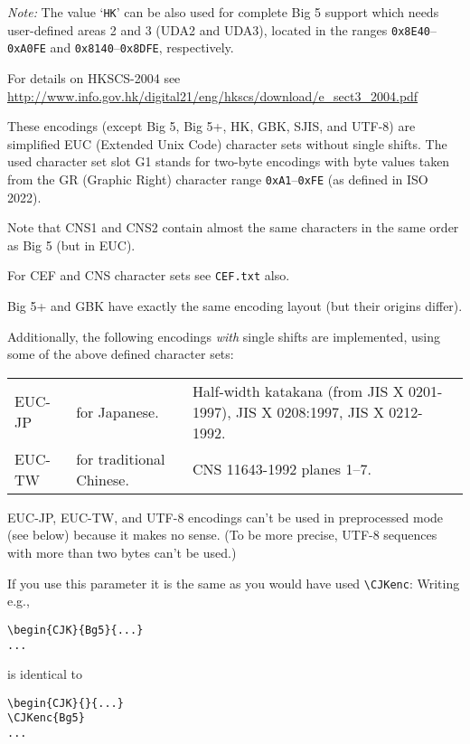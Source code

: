 \documentclass[a4paper, 11pt, draft]{article}
\begin{document}
\emph{Note:} The value `\texttt{HK}' can be also used for complete Big 5
support which needs user-defined areas 2 and 3
(UDA2 and UDA3), located in the ranges
\texttt{0x8E40}--\texttt{0xA0FE} and \texttt{0x8140}--\texttt{0x8DFE}, respectively.

For details on HKSCS-2004 see
\url{http://www.info.gov.hk/digital21/eng/hkscs/download/e_sect3_2004.pdf}

These encodings (except Big 5, Big 5+, HK, GBK, SJIS, and
UTF-8) are simplified EUC (Extended Unix Code) character
sets without single shifts. The used character set slot
G1 stands for two-byte encodings with byte values taken
from the GR (Graphic Right) character range \texttt{0xA1}--\texttt{0xFE}
(as defined in ISO\,2022).

Note that CNS1 and CNS2 contain almost the same
characters in the same order as Big 5 (but in EUC).

For CEF and CNS character sets see \texttt{CEF.txt} also.

Big 5+ and GBK have exactly the same encoding layout
(but their origins differ).

Additionally, the following encodings \emph{with} single
shifts are implemented, using some of the above defined
character sets:
%
\begin{center}
  \begin{tabular}{
      @{}
      >{\ttfamily}l
      >{\RaggedRight\arraybackslash}m{25mm}
      >{\RaggedRight\arraybackslash}m{71mm}
      @{}
    }
    \toprule
    \multicolumn{1}{@{}l}{\textbf{Encoding}} & \multicolumn{1}{l}{\textbf{Description}} & \multicolumn{1}{l}{\textbf{Character sets}} \\
    \midrule
    EUC-JP & for Japanese. & Half-width katakana (from JIS X 0201-1997), JIS X 0208:1997, JIS X 0212-1992. \\[1.5mm]
    EUC-TW & for traditional Chinese. & CNS 11643-1992 planes 1--7. \\
    \bottomrule
  \end{tabular}
\end{center}

EUC-JP, EUC-TW, and UTF-8 encodings can't be used in
preprocessed mode (see below) because it makes no sense.
(To be more precise, UTF-8 sequences with more than two
bytes can't be used.)

If you use this parameter it is the same as you would
have used \verb+\CJKenc+: Writing e.g.,
%
\begin{verbatim}
\begin{CJK}{Bg5}{...}
...
\end{verbatim}
%
is identical to
%
\begin{verbatim}
\begin{CJK}{}{...}
\CJKenc{Bg5}
...
\end{verbatim}
\end{document}
